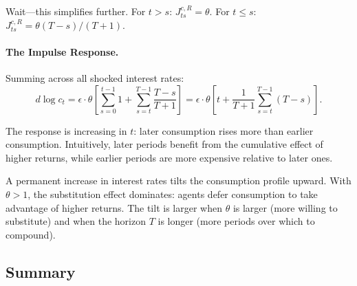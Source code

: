 Wait---this simplifies further. For $t > s$: $J^{c,R}_{ts} = \theta$. For $t \leq s$: $J^{c,R}_{ts} = \theta (T - s)/(T+1)$.

\paragraph{The Impulse Response.}
Summing across all shocked interest rates:
\begin{equation}
d \log c_t = \epsilon \cdot \theta \left[ \sum_{s=0}^{t-1} 1 + \sum_{s=t}^{T-1} \frac{T - s}{T + 1} \right] = \epsilon \cdot \theta \left[ t + \frac{1}{T+1} \sum_{s=t}^{T-1} (T - s) \right].
\label{eq:impulse-response-calc}
\end{equation}

The response is increasing in $t$: later consumption rises more than earlier consumption. Intuitively, later periods benefit from the cumulative effect of higher returns, while earlier periods are more expensive relative to later ones.

\begin{calloutnote}
A permanent increase in interest rates tilts the consumption profile upward. With $\theta > 1$, the substitution effect dominates: agents defer consumption to take advantage of higher returns. The tilt is larger when $\theta$ is larger (more willing to substitute) and when the horizon $T$ is longer (more periods over which to compound).
\end{calloutnote}

\subsection{Summary}
\label{subsec:T-summary}

